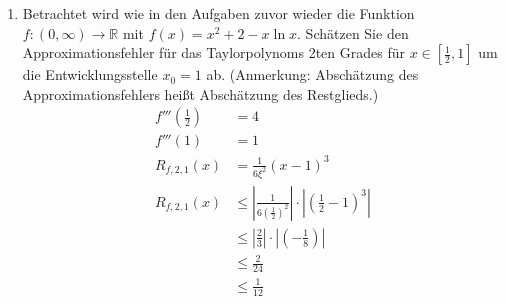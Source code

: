 \documentclass[12pt]{article}
\begin{document}
\begin{enumerate}[start=1,label={\bfseries Frage \arabic*:},leftmargin=1in]
    \item Betrachtet wird wie in den Aufgaben zuvor wieder die Funktion $f:(0,\infty) \to \mathbb{R}$ mit $f(x)=x^{2} + 2 - x \ln{x}$. Schätzen Sie den Approximationsfehler für das Taylorpolynoms 2ten Grades für $x \in [\frac{1}{2},1]$ um die Entwicklungsstelle $x_0=1$ ab. (Anmerkung: Abschätzung des Approximationsfehlers heißt Abschätzung des Restglieds.)
    \begin{align*}
        f'''(\frac{1}{2})&=4 \\
        f'''(1)&=1 \\
        R_{f,2,1}(x)&=\frac{1}{6\xi^2}(x-1)^3 \\
        R_{f,2,1}(x)&\le |\frac{1}{6(\frac{1}{2})^2}| \cdot |(\frac{1}{2} - 1)^3| \\
        &\le |\frac{2}{3}| \cdot |(-\frac{1}{8})| \\
        &\le \frac{2}{24} \\
        &\le \frac{1}{12}
    \end{align*}

\end{enumerate}
\end{document}
